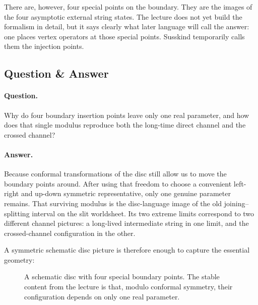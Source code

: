 There are, however, four special points on the boundary. They are the images of the four asymptotic external string states. The lecture does not yet build the formalism in detail, but it says clearly what later language will call the answer: one places vertex operators at those special points. Susskind temporarily calls them the injection points.

\subsection{Question \& Answer}

\paragraph{Question.} Why do four boundary insertion points leave only one real parameter, and how does that single modulus reproduce both the long-time direct channel and the crossed channel?

\paragraph{Answer.} Because conformal transformations of the disc still allow us to move the boundary points around. After using that freedom to choose a convenient left-right and up-down symmetric representative, only one genuine parameter remains. That surviving modulus is the disc-language image of the old joining--splitting interval on the slit worldsheet. Its two extreme limits correspond to two different channel pictures: a long-lived intermediate string in one limit, and the crossed-channel configuration in the other.

A symmetric schematic disc picture is therefore enough to capture the essential geometry:

\begin{figure}
\centering
{}
\caption{A schematic disc with four special boundary points. The stable content from the lecture is that, modulo conformal symmetry, their configuration depends on only one real parameter.}
\end{figure}


